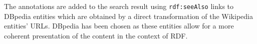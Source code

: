 \documentclass{llncs}
\begin{document}
\begin{itemize}
The annotations are added to the search result using \texttt{rdf:seeAlso} links to DBpedia entities \cite{key:dbpedia} which are obtained by a direct transformation of the Wikipedia entities' URLs. DBpedia has been chosen as these entities allow for a more coherent presentation of the content in the context of RDF.

\end{itemize}

\end{document}
